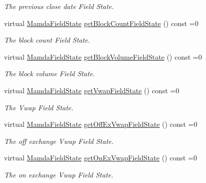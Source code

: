 \begin{CompactItemize}
\begin{CompactList}\small\item\em The previous close date Field State. \item\end{CompactList}\item 
virtual \hyperlink{namespaceWombat_93aac974f2ab713554fd12a1fa3b7d2a}{Mamda\-Field\-State} \hyperlink{classWombat_1_1MamdaTradeRecap_9b4768cd8bfe696c5a217d32926426f1}{get\-Block\-Count\-Field\-State} () const =0
\begin{CompactList}\small\item\em The block count Field State. \item\end{CompactList}\item 
virtual \hyperlink{namespaceWombat_93aac974f2ab713554fd12a1fa3b7d2a}{Mamda\-Field\-State} \hyperlink{classWombat_1_1MamdaTradeRecap_f39bf8db19885374b44a37a6b36311b1}{get\-Block\-Volume\-Field\-State} () const =0
\begin{CompactList}\small\item\em The block volume Field State. \item\end{CompactList}\item 
virtual \hyperlink{namespaceWombat_93aac974f2ab713554fd12a1fa3b7d2a}{Mamda\-Field\-State} \hyperlink{classWombat_1_1MamdaTradeRecap_4a05775b568f16662fdcf8f34f5cecde}{get\-Vwap\-Field\-State} () const =0
\begin{CompactList}\small\item\em The Vwap Field State. \item\end{CompactList}\item 
virtual \hyperlink{namespaceWombat_93aac974f2ab713554fd12a1fa3b7d2a}{Mamda\-Field\-State} \hyperlink{classWombat_1_1MamdaTradeRecap_73079a6a76e523eb7693e9102743ba7c}{get\-Off\-Ex\-Vwap\-Field\-State} () const =0
\begin{CompactList}\small\item\em The off exchange Vwap Field State. \item\end{CompactList}\item 
virtual \hyperlink{namespaceWombat_93aac974f2ab713554fd12a1fa3b7d2a}{Mamda\-Field\-State} \hyperlink{classWombat_1_1MamdaTradeRecap_28e307415c29dc4a04b1790fabd3ad4f}{get\-On\-Ex\-Vwap\-Field\-State} () const =0
\begin{CompactList}\small\item\em The on exchange Vwap Field State. \item\end{CompactList}\item 

\end{CompactItemize}
